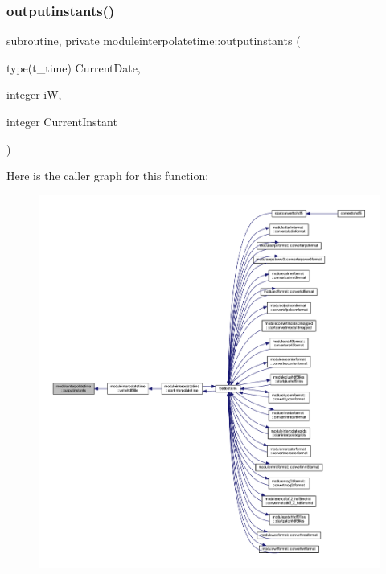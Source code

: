 \subsubsection{\texorpdfstring{outputinstants()}{outputinstants()}}
{\footnotesize\ttfamily subroutine, private moduleinterpolatetime\+::outputinstants (\begin{DoxyParamCaption}\item[{type(t\+\_\+time)}]{Current\+Date,  }\item[{integer}]{iW,  }\item[{integer}]{Current\+Instant }\end{DoxyParamCaption})\hspace{0.3cm}{\ttfamily [private]}}

Here is the caller graph for this function\+:\nopagebreak
\begin{figure}[H]
\begin{center}
\leavevmode
\includegraphics[width=350pt]{namespacemoduleinterpolatetime_a74dbf441733e6031ead9d8056ffa421f_icgraph}
\end{center}
\end{figure}
\mbox{\label{namespacemoduleinterpolatetime_ad261b036016fd92d9944eb5b6d0332b6}} 
